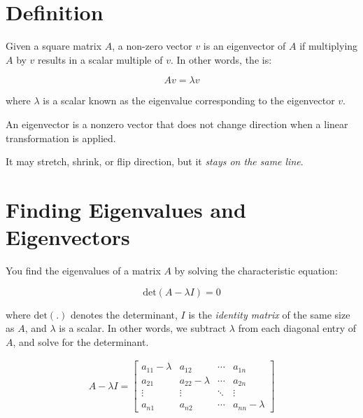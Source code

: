 \section{Definition}

\begin{mdframed}[frametitle = {Eigenvector and Eigen Equation}, style = important]

  Given a square matrix $A$, a non-zero vector $v$ is an eigenvector of
  $A$ if multiplying $A$ by $v$ results in a scalar multiple of $v$. In other words, the  is:
  
  \begin{equation}
  Av = \lambda v
  \end{equation}
  
  where $\lambda$ is a scalar known as the eigenvalue corresponding to the eigenvector $v$.
\end{mdframed}

An eigenvector is a nonzero vector that does not change direction when a linear transformation is applied.

It may stretch, shrink, or flip direction, but it \emph{stays on the same line}.
\section{Finding Eigenvalues and Eigenvectors}
You find the eigenvalues of a matrix $A$  by solving the characteristic equation:

\begin{equation}
\text{det}(A - \lambda I) = 0
\end{equation}

where $\text{det}(.)$ denotes the determinant, $I$ is the \emph{identity
matrix} of the same size as $A$, and $\lambda$ is a scalar. In other words, we subtract $\lambda$ from each diagonal entry of $A$, and solve for the determinant.

 $$\begin{array}{c} A - \lambda I =
\begin{bmatrix}
a_{11} - \lambda & a_{12} & \cdots & a_{1n} \\
a_{21} & a_{22} - \lambda & \cdots & a_{2n} \\
\vdots & \vdots & \ddots & \vdots \\
a_{n1} & a_{n2} & \cdots & a_{nn} - \lambda
\end{bmatrix} \end{array}$$

